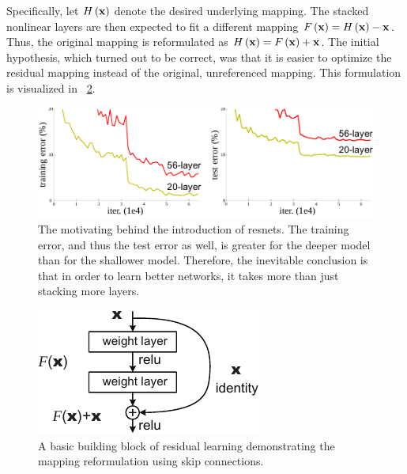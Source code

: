 Specifically, let ${H} \left( \mathbf{x} \right)$ denote the desired underlying mapping. The stacked nonlinear layers are then expected to fit a different mapping ${F} \left( \mathbf{x} \right) = {H} \left( \mathbf{x} \right) - \mathbf{x}$. Thus, the original mapping is reformulated as ${H} \left( \mathbf{x} \right) = {F} \left( \mathbf{x} \right) + \mathbf{x}$. The initial hypothesis, which turned out to be correct, was that it is easier to optimize the residual mapping instead of the original, unreferenced mapping. This formulation is visualized in \figtext{}~\ref{fig:SkipConnections}.

\begin{figure}[t]
    \centerline{\includegraphics[width=0.8\linewidth]{figures/theoretical_foundations/resnet_motivation.pdf}}
    \caption[\Gls{resnet} motivation]{The motivating behind the introduction of \glspl{resnet}. The training error, and thus the test error as well, is greater for the deeper model than for the shallower model. Therefore, the inevitable conclusion is that in order to learn better networks, it takes more than just stacking more layers. }
    \label{fig:ResnetMotivation}
\end{figure}

\begin{figure}[t]
    \centerline{\includegraphics[width=0.4\linewidth]{figures/theoretical_foundations/skip_connections.pdf}}
    \caption[Skip connections]{A basic building block of residual learning demonstrating the mapping reformulation using skip connections. }
    \label{fig:SkipConnections}
\end{figure}

